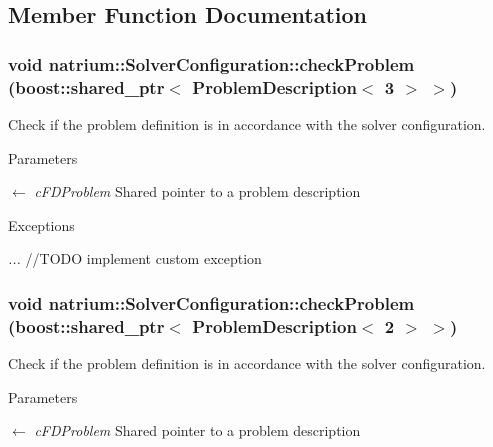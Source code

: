 \subsection{Member Function Documentation}
\hypertarget{classnatrium_1_1SolverConfiguration_a3c66c7b0c5de2bee900835931c50ed5a}{
\subsubsection[{checkProblem}]{\setlength{\rightskip}{0pt plus 5cm}void natrium::SolverConfiguration::checkProblem (boost::shared\_\-ptr$<$ {\bf ProblemDescription}$<$ 3 $>$ $>$)}}
\label{classnatrium_1_1SolverConfiguration_a3c66c7b0c5de2bee900835931c50ed5a}


Check if the problem definition is in accordance with the solver configuration. 
\begin{DoxyParams}{Parameters}
\item[\mbox{$\leftarrow$} {\em cFDProblem}]Shared pointer to a problem description\end{DoxyParams}

\begin{DoxyExceptions}{Exceptions}
\item[{\em ...}]//TODO implement custom exception \end{DoxyExceptions}
\hypertarget{classnatrium_1_1SolverConfiguration_a368a252965c1b23f7ad6811fdd0adcd4}{
\subsubsection[{checkProblem}]{\setlength{\rightskip}{0pt plus 5cm}void natrium::SolverConfiguration::checkProblem (boost::shared\_\-ptr$<$ {\bf ProblemDescription}$<$ 2 $>$ $>$)}}
\label{classnatrium_1_1SolverConfiguration_a368a252965c1b23f7ad6811fdd0adcd4}


Check if the problem definition is in accordance with the solver configuration. 
\begin{DoxyParams}{Parameters}
\item[\mbox{$\leftarrow$} {\em cFDProblem}]Shared pointer to a problem description\end{DoxyParams}

